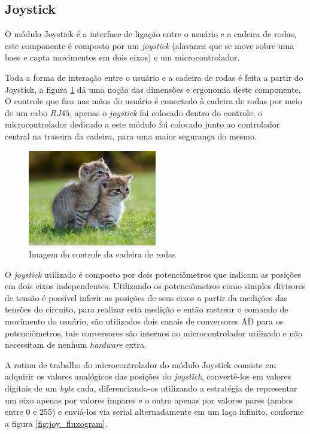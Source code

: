 \subsection{Joystick}

O módulo Joystick é a interface de ligação entre o usuário e a cadeira de rodas, este componente é composto por um \textit{joystick} (alavanca que se move sobre uma base e capta movimentos em dois eixos) e um microcontrolador.

Toda a forma de interação entre o usuário e a cadeira de rodas é feita a partir do Joystick, a figura \ref{fig:joy_hand_control} dá uma noção das dimensões e ergonomia deste componente. O controle que fica nas mãos do usuário é conectado à cadeira de rodas por meio de um cabo $RJ45$, apenas o \textit{joystick} foi colocado dentro do controle, o microcontrolador dedicado a este módulo foi colocado junto ao controlador central na traseira da cadeira, para uma maior segurança do mesmo.

\begin{figure}[!htb]
\centering
\includegraphics[width = 0.5\textwidth]{figuras/resultados/joy_hand_control}
\caption{Imagem do controle da cadeira de rodas}
\label{fig:joy_hand_control}
\end{figure}

O \textit{joystick} utilizado é composto por dois potenciômetros que indicam as posições em dois eixos independentes. Utilizando os potenciômetros como simples divisores de tensão é possível inferir as posições de seus eixos a partir da medições das tensões do circuito, para realizar esta medição e então rastrear o comando de movimento do usuário, são utilizados dois canais de conversores AD para os potenciômetros, tais conversores são internos ao microcontrolador utilizado e não necessitam de nenhum \textit{hardware} extra.

A rotina de trabalho do microcontrolador do módulo Joystick consiste em adquirir os valores analógicos das posições do \textit{joystick}, convertê-los em valores digitais de um \textit{byte} cada, diferenciando-os utilizando a estratégia de representar um eixo apenas por valores ímpares e o outro apenas por valores pares (ambos entre 0 e 255) e enviá-los via serial alternadamente em um laço infinito, conforme a figura \ref{fig:joy_fluxogram}.

